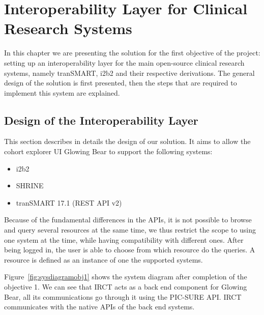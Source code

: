 
\chapter{Interoperability Layer for Clinical Research Systems}


In this chapter we are presenting the solution for the first objective of the project:
setting up an interoperability layer for the main open-source clinical research systems, namely tranSMART, i2b2 and their respective derivations.
The general design of the solution is first presented, then the steps that are required to implement this system are explained.

\section{Design of the Interoperability Layer}

This section describes in details the design of our solution. %
It aims to allow the cohort explorer UI Glowing Bear to support the following systems:
\begin{itemize}
    \item i2b2
    \item SHRINE 
    \item tranSMART 17.1 (REST API v2)
\end{itemize}

Because of the fundamental differences in the APIs, it is not possible to browse and query several resources at the same time, we thus restrict the scope to using one system at the time, while having compatibility with different ones.
After being logged in, the user is able to choose from which resource do the queries.
A resource is defined as an instance of one the supported systems.

Figure~\ref{fig:sysdiagramobj1} shows the system diagram after completion of the objective 1.
We can see that IRCT acts as a back end component for Glowing Bear, all its communications go through it using the PIC-SURE API.
IRCT communicates with the native APIs of the back end systems.

